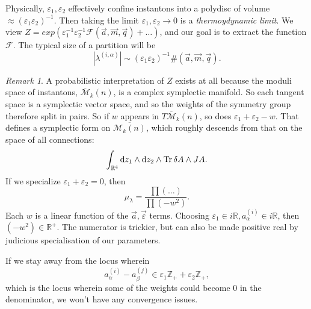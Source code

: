 \documentclass[leqno, openany]{memoir}
\theoremstyle{definition}
\theoremstyle{remark}
\newtheorem{rmk}[thm]{Remark}
\theoremstyle{plain}
\theoremstyle{definition}
\theoremstyle{remark}
\newcommand{\ep}{\varepsilon}
\begin{document}
Physically, $\ep_1,\ep_2$ effectively confine instantons into a polydisc of volume $\approx (\ep_1 \ep_2)^{-1}$.
Then taking the limit $\ep_1,\ep_2 \to 0$ is a \emph{thermoydynamic limit}. 
We view $Z = exp( \ep_1^{-1} \ep_2^{-1} \mathcal{F}(\vec{a},\vec{m},\vec{q}) + \dots)$,
and our goal is to extract the function $\mathcal{F}$. 
The typical size of a partition will be 
\[
|\lambda^{(i,\alpha)}| \sim (\ep_1 \ep_2)^{-1} \#(\vec{a},\vec{m},\vec{q}).
\]

\begin{rmk}
A probabilistic interpretation of $Z$ exists at all because the moduli space of instantons, 
$\overline{\mathcal{M}}_k(n)$, is a complex symplectic manifold. So each tangent space is a symplectic vector space, and so the 
weights of the symmetry group therefore split in pairs. So if $w$ appears in $T \overline{\mathcal{M}}_k(n)$, so does $\ep_1 + \ep_2 - w$. 
That defines a symplectic form on $\overline{\mathcal{M}_k(n)}$, which roughly descends from that on the space of all connections:
\[
\int_{\mathbb{R}^4} \dd z_1 \wedge \dd z_2 \wedge \Tr \delta A \wedge JA.
\]
If we specialize $\ep_1 + \ep_2 = 0$, then 
\[
\mu_\lambda = \frac{\prod(\dots)}{\prod (-w^2)}.
\]
Each $w$ is a linear function of the $\vec{a},\vec{\ep}$ terms. Choosing $\ep_1 \in i \mathbb{R}, a_\alpha^{(i)} \in i \mathbb{R}$, 
then $(-w^2) \in \mathbb{R}^+$. The numerator is trickier, but can also be made positive real by judicious specialisation of our parameters.
\end{rmk}

If we stay away from the locus wherein 
\[
a_\alpha^{(i)} - a_\beta^{(j)} \in \ep_1 \mathbb{Z}_+ + \ep_2 \mathbb{Z}_+,
\]
which is the locus wherein some of the weights could become 0 in the denominator,
we won't have any convergence issues.
\end{document}
